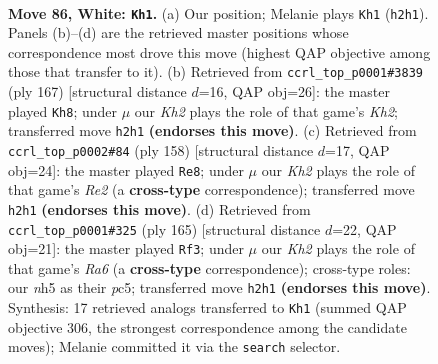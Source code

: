 \documentclass[11pt]{article}
\begin{document}
\clearpage

\begin{figure}[p]\centering
\begin{subfigure}{0.46\textwidth}\centering
\resizebox{\linewidth}{!}{%
\newchessgame
\chessboard[
  setfen={3k4/8/R7/7n/p6r/P6p/7K/8 w - - 30 86},
  showmover=false,
  pgfstyle=straightmove, color=movearrow, markmove={h2-h1}
]}
\caption{}
\end{subfigure}\hfill
\begin{subfigure}{0.46\textwidth}\centering
\resizebox{\linewidth}{!}{%
\newchessgame
\chessboard[
  setfen={8/7k/P3R2P/8/8/r4p2/5K2/8 b - - 0 84},
  showmover=false,
  pgfstyle=straightmove, color=movearrow, markmove={h7-h8}
]}
\caption{}
\end{subfigure}
\\[4pt]
\begin{subfigure}{0.46\textwidth}\centering
\resizebox{\linewidth}{!}{%
\newchessgame
\chessboard[
  setfen={8/8/2r3k1/8/6P1/8/2p1R3/2K5 w - - 7 80},
  showmover=false,
  pgfstyle=straightmove, color=movearrow, markmove={e2-e8}
]}
\caption{}
\end{subfigure}\hfill
\begin{subfigure}{0.46\textwidth}\centering
\resizebox{\linewidth}{!}{%
\newchessgame
\chessboard[
  setfen={8/k7/P3R3/2P5/2K5/r7/8/8 b - - 46 83},
  showmover=false,
  pgfstyle=straightmove, color=movearrow, markmove={a3-f3}
]}
\caption{}
\end{subfigure}
\caption{\textbf{Move 86, White: \texttt{Kh1}.} (a) Our position; Melanie plays \texttt{Kh1} (\texttt{h2h1}). Panels (b)--(d) are the retrieved master positions whose correspondence most drove this move (highest QAP objective among those that transfer to it). (b) Retrieved from \texttt{ccrl\_top\_p0001\#3839} (ply 167) [structural distance $d$=16, QAP obj=26]: the master played \texttt{Kh8}; under $\mu$ our \emph{Kh2} plays the role of that game's \emph{Kh2}; transferred move \texttt{h2h1} \textbf{(endorses this move)}. (c) Retrieved from \texttt{ccrl\_top\_p0002\#84} (ply 158) [structural distance $d$=17, QAP obj=24]: the master played \texttt{Re8}; under $\mu$ our \emph{Kh2} plays the role of that game's \emph{Re2} (a \textbf{cross-type} correspondence); transferred move \texttt{h2h1} \textbf{(endorses this move)}. (d) Retrieved from \texttt{ccrl\_top\_p0001\#325} (ply 165) [structural distance $d$=22, QAP obj=21]: the master played \texttt{Rf3}; under $\mu$ our \emph{Kh2} plays the role of that game's \emph{Ra6} (a \textbf{cross-type} correspondence); cross-type roles: our \emph{n}h5 as their \emph{p}c5; transferred move \texttt{h2h1} \textbf{(endorses this move)}. Synthesis: 17 retrieved analogs transferred to \texttt{Kh1} (summed QAP objective 306, the strongest correspondence among the candidate moves); Melanie committed it via the \texttt{search} selector.}
\label{fig:thought-m170}
\end{figure}
\end{document}
